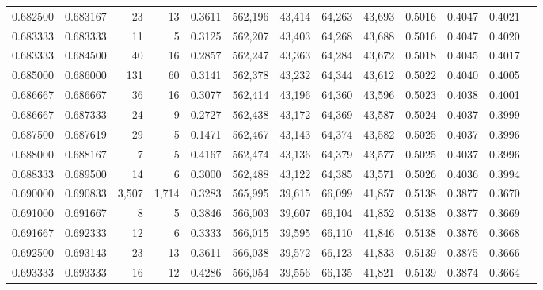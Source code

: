 \begin{tabular}{rrrrrrrrrrrrr}
0.682500 & 0.683167 &     23 &    13 &                                     0.3611 & 562,196 &  43,414 &  64,263 &  43,693 & 0.5016 & 0.4047 & 0.4021 \\
0.683333 & 0.683333 &     11 &     5 &                                     0.3125 & 562,207 &  43,403 &  64,268 &  43,688 & 0.5016 & 0.4047 & 0.4020 \\
0.683333 & 0.684500 &     40 &    16 &                                     0.2857 & 562,247 &  43,363 &  64,284 &  43,672 & 0.5018 & 0.4045 & 0.4017 \\
0.685000 & 0.686000 &    131 &    60 &                                     0.3141 & 562,378 &  43,232 &  64,344 &  43,612 & 0.5022 & 0.4040 & 0.4005 \\
0.686667 & 0.686667 &     36 &    16 &                                     0.3077 & 562,414 &  43,196 &  64,360 &  43,596 & 0.5023 & 0.4038 & 0.4001 \\
0.686667 & 0.687333 &     24 &     9 &                                     0.2727 & 562,438 &  43,172 &  64,369 &  43,587 & 0.5024 & 0.4037 & 0.3999 \\
0.687500 & 0.687619 &     29 &     5 &                                     0.1471 & 562,467 &  43,143 &  64,374 &  43,582 & 0.5025 & 0.4037 & 0.3996 \\
0.688000 & 0.688167 &      7 &     5 &                                     0.4167 & 562,474 &  43,136 &  64,379 &  43,577 & 0.5025 & 0.4037 & 0.3996 \\
0.688333 & 0.689500 &     14 &     6 &                                     0.3000 & 562,488 &  43,122 &  64,385 &  43,571 & 0.5026 & 0.4036 & 0.3994 \\
0.690000 & 0.690833 &  3,507 & 1,714 &                                     0.3283 & 565,995 &  39,615 &  66,099 &  41,857 & 0.5138 & 0.3877 & 0.3670 \\
0.691000 & 0.691667 &      8 &     5 &                                     0.3846 & 566,003 &  39,607 &  66,104 &  41,852 & 0.5138 & 0.3877 & 0.3669 \\
0.691667 & 0.692333 &     12 &     6 &                                     0.3333 & 566,015 &  39,595 &  66,110 &  41,846 & 0.5138 & 0.3876 & 0.3668 \\
0.692500 & 0.693143 &     23 &    13 &                                     0.3611 & 566,038 &  39,572 &  66,123 &  41,833 & 0.5139 & 0.3875 & 0.3666 \\
0.693333 & 0.693333 &     16 &    12 &                                     0.4286 & 566,054 &  39,556 &  66,135 &  41,821 & 0.5139 & 0.3874 & 0.3664 \\

\end{tabular}
